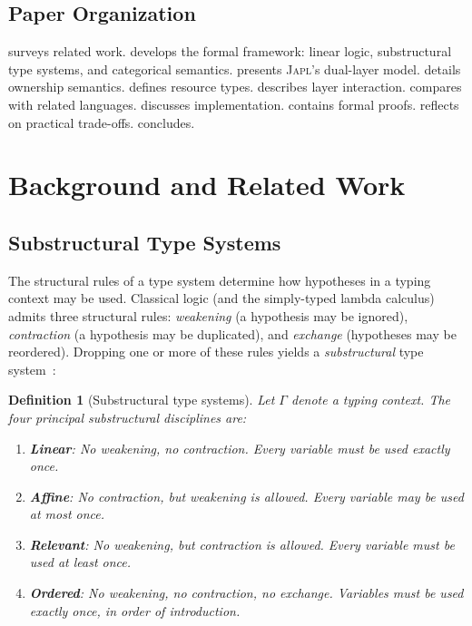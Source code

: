 \documentclass[11pt]{article}
\newtheorem{definition}[theorem]{Definition}
\newcommand{\JAPL}{\textsc{Japl}}
\begin{document}
\subsection{Paper Organization}

 surveys related work.  
develops the formal framework: linear logic, substructural type
systems, and categorical semantics.   presents
\JAPL{}'s dual-layer model.   details ownership
semantics.   defines resource types.
 describes layer interaction.
 compares with related languages.
 discusses implementation.
 contains formal proofs.
 reflects on practical trade-offs.
 concludes.


\section{Background and Related Work}\label{sec:background}

\subsection{Substructural Type Systems}

The structural rules of a type system determine how hypotheses in a
typing context may be used.  Classical logic (and the simply-typed
lambda calculus) admits three structural rules: \emph{weakening}
(a hypothesis may be ignored), \emph{contraction} (a hypothesis may
be duplicated), and \emph{exchange} (hypotheses may be reordered).
Dropping one or more of these rules yields a \emph{substructural}
type system~\cite{walker2005substructural}:

\begin{definition}[Substructural type systems]\label{def:substructural}
Let $\Gamma$ denote a typing context.  The four principal substructural
disciplines are:
\begin{enumerate}[label=(\alph*)]
  \item \textbf{Linear}: No weakening, no contraction.  Every variable
        must be used exactly once.
  \item \textbf{Affine}: No contraction, but weakening is allowed.
        Every variable may be used at most once.
  \item \textbf{Relevant}: No weakening, but contraction is allowed.
        Every variable must be used at least once.
  \item \textbf{Ordered}: No weakening, no contraction, no exchange.
        Variables must be used exactly once, in order of introduction.
\end{enumerate}
\end{definition}
\end{document}
